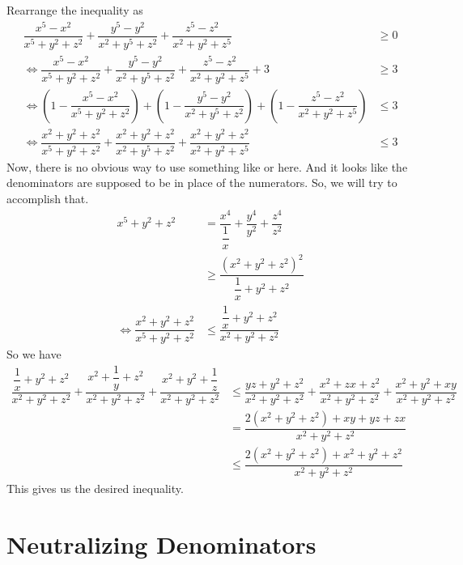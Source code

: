 \documentclass[inequalities.tex]{subfile}
\begin{document}
\begin{problem}
				\begin{solution}
					Rearrange the inequality as
						\begin{align*}
							\dfrac{x^{5}-x^{2}}{x^{5}+y^{2}+z^{2}}+\dfrac{y^{5}-y^{2}}{x^{2}+y^{5}+z^{2}}+\dfrac{z^{5}-z^{2}}{x^{2}+y^{2}+z^{5}}
								& \geq0\\
							\iff \dfrac{x^{5}-x^{2}}{x^{5}+y^{2}+z^{2}}+\dfrac{y^{5}-y^{2}}{x^{2}+y^{5}+z^{2}}+\dfrac{z^{5}-z^{2}}{x^{2}+y^{2}+z^{5}}+3
								& \geq 3\\
							\iff \left(1-\dfrac{x^{5}-x^{2}}{x^{5}+y^{2}+z^{2}}\right)+\left(1-\dfrac{y^{5}-y^{2}}{x^{2}+y^{5}+z^{2}}\right)+\left(1-\dfrac{z^{5}-z^{2}}{x^{2}+y^{2}+z^{5}}\right)
								& \leq 3\\
							\iff \dfrac{x^{2}+y^{2}+z^{2}}{x^{5}+y^{2}+z^{2}}+\dfrac{x^{2}+y^{2}+z^{2}}{x^{2}+y^{5}+z^{2}}+\dfrac{x^{2}+y^{2}+z^{2}}{x^{2}+y^{2}+z^{5}}
								& \leq 3
						\end{align*}
					Now, there is no obvious way to use something like  or  here. And it looks like the denominators are supposed to be in place of the numerators. So, we will try to accomplish that.
						\begin{align*}
							x^{5}+y^{2}+z^{2}
								& = \dfrac{x^{4}}{\dfrac{1}{x}}+\dfrac{y^{4}}{y^{2}}+\dfrac{z^{4}}{z^{2}}\\
								& \geq \dfrac{(x^{2}+y^{2}+z^{2})^{2}}{\dfrac{1}{x}+y^{2}+z^{2}}\\
							\iff \dfrac{x^{2}+y^{2}+z^{2}}{x^{5}+y^{2}+z^{2}}
								& \leq \dfrac{\dfrac{1}{x}+y^{2}+z^{2}}{x^{2}+y^{2}+z^{2}}
						\end{align*}
					So we have
							\begin{align*}		\dfrac{\dfrac{1}{x}+y^{2}+z^{2}}{x^{2}+y^{2}+z^{2}}+\dfrac{x^{2}+\dfrac{1}{y}+z^{2}}{x^{2}+y^{2}+z^{2}}+\dfrac{x^{2}+y^{2}+\dfrac{1}{z}}{x^{2}+y^{2}+z^{2}}
								& \leq \dfrac{yz+y^{2}+z^{2}}{x^{2}+y^{2}+z^{2}}+\dfrac{x^{2}+zx+z^{2}}{x^{2}+y^{2}+z^{2}}+\dfrac{x^{2}+y^{2}+xy}{x^{2}+y^{2}+z^{2}}\\
								& = \dfrac{2(x^{2}+y^{2}+z^{2})+xy+yz+zx}{x^{2}+y^{2}+z^{2}}\\
								& \leq \dfrac{2(x^{2}+y^{2}+z^{2})+x^{2}+y^{2}+z^{2}}{x^{2}+y^{2}+z^{2}}
						\end{align*}
					This gives us the desired inequality.
				\end{solution}
		\end{problem}
	\section{Neutralizing Denominators}
\end{document}

